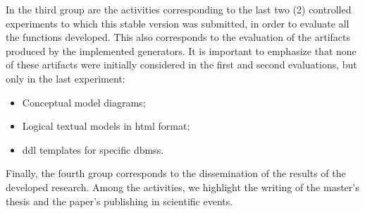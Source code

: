 In the third group are the activities corresponding to the last two (2) controlled experiments to which this stable version was submitted, in order to evaluate all the functions developed.
This also corresponds to the evaluation of the artifacts produced by the implemented generators. 
It is important to emphasize that none of these artifacts were initially considered in the first and second evaluations, but only in the last experiment:


\begin{itemize}
     \item Conceptual model diagrams;
     \item Logical textual models in \ac{html} format;
     \item \ac{ddl} templates for specific \acp{dbms}.
\end{itemize}

Finally, the fourth group corresponds to the dissemination of the results of the developed research.
Among the activities, we highlight the writing of the master's thesis and the paper's publishing in scientific events.


